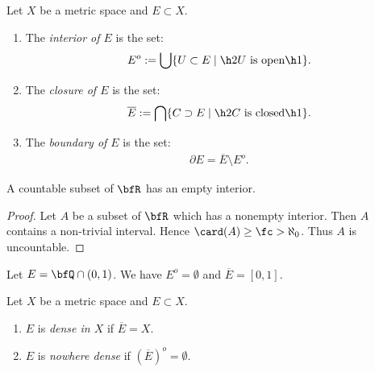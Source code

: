     \begin{definition}
        Let $X$ be a metric space and $E \subset X$.
        \begin{enumerate}[label = (\arabic*),itemsep=1pt,topsep=3pt]
            \item The \textit{interior of $E$} is the set:
                \begin{equation*}
                \begin{split}
                    E^o := \bigcup \{U \subset E \mid \h2\text{$U$ is open}\h1\}.
                \end{split}
                \end{equation*}
            \item The \textit{closure of $E$} is the set:
                \begin{equation*}
                \begin{split}
                    \overline{E} := \bigcap \{C \supset E \mid \h2\text{$C$ is closed}\h1\}.
                \end{split}
                \end{equation*}
            \item The \textit{boundary of $E$} is the set:
                \begin{equation*}
                \begin{split}
                    \partial E = \overline{E}\setminus E^o.
                \end{split}
                \end{equation*}
        \end{enumerate}
    \end{definition}

    \begin{proposition}
        A countable subset of $\bfR$ has an empty interior.
    \end{proposition}
        \begin{proof}
            Let $A$ be a subset of $\bfR$ which has a nonempty interior. Then $A$ contains a non-trivial interval. Hence $\card(A) \geq \fc > \aleph_0$. Thus $A$ is uncountable.
        \end{proof}

    \begin{example}
        Let $E = \bfQ \cap (0,1)$. We have $E^o = \emptyset$ and $\overline{E} = [0,1]$.
    \end{example}

    \begin{definition}
        Let $X$ be a metric space and $E \subset X$.
        \begin{enumerate}[label = (\arabic*),itemsep=1pt,topsep=3pt]
            \item $E$ is \textit{dense in $X$} if $\overline{E} = X$.
            \item $E$ is \textit{nowhere dense} if $(\overline{E})^o = \emptyset$.
        \end{enumerate}
    \end{definition}

